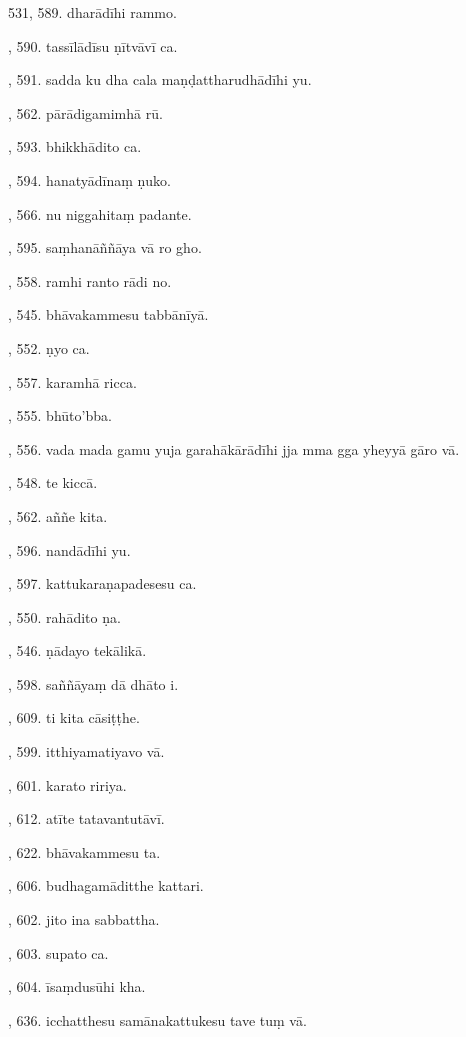 531, 589. dharādīhi rammo.\par {}, 590. tassīlādīsu ṇītvāvī ca.\par {}, 591. sadda ku dha cala maṇḍattharudhādīhi yu.\par {}, 562. pārādigamimhā rū.\par {}, 593. bhikkhādito ca.\par {}, 594. hanatyādīnaṃ ṇuko.\par {}, 566. nu niggahitaṃ padante.\par {}, 595. saṃhanāññāya vā ro gho.\par {}, 558. ramhi ranto rādi no.\par {}, 545. bhāvakammesu tabbānīyā.\par {}, 552. ṇyo ca.\par {}, 557. karamhā ricca.\par {}, 555. bhūto’bba.\par {}, 556. vada mada gamu yuja garahākārādīhi jja mma gga yheyyā gāro vā.\par {}, 548. te kiccā.\par {}, 562. aññe kita.\par {}, 596. nandādīhi yu.\par {}, 597. kattukaraṇapadesesu ca.\par {}, 550. rahādito ṇa.\par {}, 546. ṇādayo tekālikā.\par {}, 598. saññāyaṃ dā dhāto i.\par {}, 609. ti kita cāsiṭṭhe.\par {}, 599. itthiyamatiyavo vā.\par {}, 601. karato ririya.\par {}, 612. atīte tatavantutāvī.\par {}, 622. bhāvakammesu ta.\par {}, 606. budhagamāditthe kattari.\par {}, 602. jito ina sabbattha.\par {}, 603. supato ca.\par {}, 604. īsaṃdusūhi kha.\par {}, 636. icchatthesu samānakattukesu tave tuṃ vā.\par \noindent
